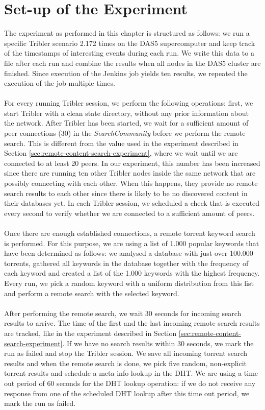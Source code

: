 \section{Set-up of the Experiment}
The experiment as performed in this chapter is structured as follows: we run a specific Tribler scenario 2.172 times on the DAS5 supercomputer and keep track of the timestamps of interesting events during each run. We write this data to a file after each run and combine the results when all nodes in the DAS5 cluster are finished. Since execution of the Jenkins job yields ten results, we repeated the execution of the job multiple times.\\\\
For every running Tribler session, we perform the following operations: first, we start Tribler with a clean state directory, without any prior information about the network. After Tribler has been started, we wait for a sufficient amount of peer  connections (30) in the \emph{SearchCommunity} before we perform the remote search. This is different from the value used in the experiment described in Section \ref{sec:remote-content-search-experiment}, where we wait until we are connected to at least 20 peers. In our experiment, this number has been increased since there are running ten other Tribler nodes inside the same network that are possibly connecting with each other. When this happens, they provide no remote search results to each other since there is likely to be no discovered content in their databases yet. In each Tribler session, we scheduled a check that is executed every second to verify whether we are connected to a sufficient amount of peers.\\\\
Once there are enough established connections, a remote torrent keyword search is performed. For this purpose, we are using a list of 1.000 popular keywords that have been determined as follows: we analysed a database with just over 100.000 torrents, gathered all keywords in the database together with the frequency of each keyword and created a list of the 1.000 keywords with the highest frequency. Every run, we pick a random keyword  with a uniform distribution from this list and perform a remote search with the selected keyword.\\\\
After performing the remote search, we wait 30 seconds for incoming search results to arrive. The time of the first and the last incoming remote search results are tracked, like in the experiment described in Section \ref{sec:remote-content-search-experiment}. If we have no search results within 30 seconds, we mark the run as failed and stop the Tribler session. We save all incoming torrent search results and when the remote search is done, we pick five random, non-explicit torrent results and schedule a meta info lookup in the DHT. We are using a time out period of 60 seconds for the DHT lookup operation: if we do not receive any response from one of the scheduled DHT lookup after this time out period, we mark the run as failed.\\\\
